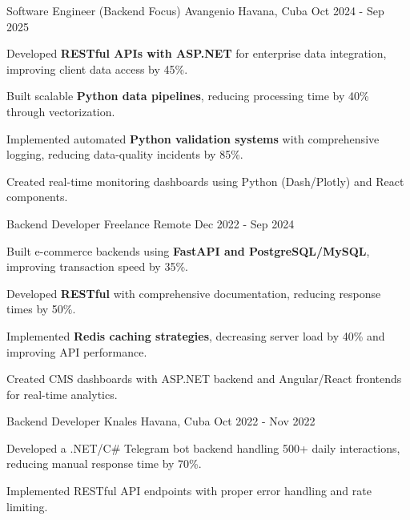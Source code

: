 \documentclass[]{awesome-cv}
\begin{document}
\begin{cventries}
  \cventry
    {Software Engineer (Backend Focus)}
    {Avangenio}
    {Havana, Cuba}
    {Oct 2024 - Sep 2025}
    {\begin{cvitems}
        \item Developed \textbf{RESTful APIs with ASP.NET} for enterprise data integration, improving client data access by 45\%.
        \item Built scalable \textbf{Python data pipelines}, reducing processing time by 40\% through vectorization.
        \item Implemented automated \textbf{Python validation systems} with comprehensive logging, reducing data-quality incidents by 85\%.
        \item Created real-time monitoring dashboards using Python (Dash/Plotly) and React components.
        \end{cvitems}}

  \cventry
    {Backend Developer}
    {Freelance}
    {Remote}
    {Dec 2022 - Sep 2024}
    {\begin{cvitems}
        \item Built e-commerce backends using \textbf{FastAPI and PostgreSQL/MySQL}, improving transaction speed by 35\%.
        \item Developed \textbf{RESTful} with comprehensive documentation, reducing response times by 50\%.
        \item Implemented \textbf{Redis caching strategies}, decreasing server load by 40\% and improving API performance.
        \item Created CMS dashboards with ASP.NET backend and Angular/React frontends for real-time analytics.
        \end{cvitems}}

  \cventry
    {Backend Developer}
    {Knales}
    {Havana, Cuba}
    {Oct 2022 - Nov 2022}
    {\begin{cvitems}
        \item Developed a .NET/C\# Telegram bot backend handling 500+ daily interactions, reducing manual response time by 70\%.
        \item Implemented RESTful API endpoints with proper error handling and rate limiting.
      \end{cvitems}}
\end{cventries}
\end{document}
